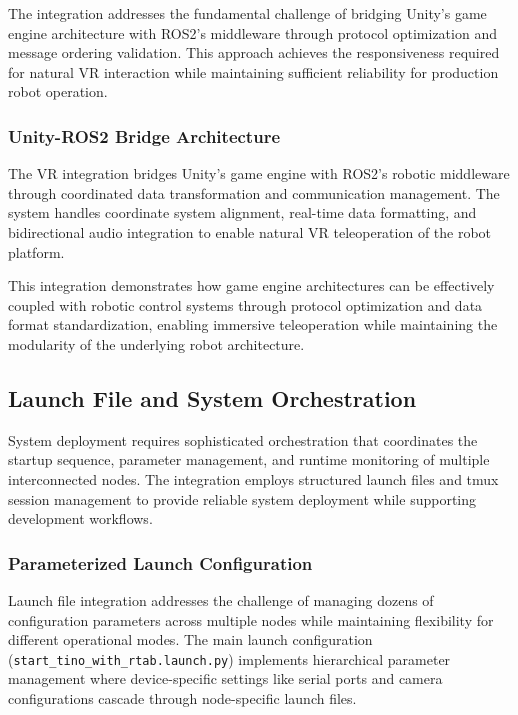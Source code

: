 The integration addresses the fundamental challenge of bridging Unity's game engine architecture with ROS2's middleware through protocol optimization and message ordering validation. This approach achieves the responsiveness required for natural VR interaction while maintaining sufficient reliability for production robot operation.

\subsubsection{Unity-ROS2 Bridge Architecture}

The VR integration bridges Unity's game engine with ROS2's robotic middleware through coordinated data transformation and communication management. The system handles coordinate system alignment, real-time data formatting, and bidirectional audio integration to enable natural VR teleoperation of the robot platform.

This integration demonstrates how game engine architectures can be effectively coupled with robotic control systems through protocol optimization and data format standardization, enabling immersive teleoperation while maintaining the modularity of the underlying robot architecture.

\subsection{Launch File and System Orchestration}

System deployment requires sophisticated orchestration that coordinates the startup sequence, parameter management, and runtime monitoring of multiple interconnected nodes. The integration employs structured launch files and tmux session management to provide reliable system deployment while supporting development workflows.

\subsubsection{Parameterized Launch Configuration}

Launch file integration addresses the challenge of managing dozens of configuration parameters across multiple nodes while maintaining flexibility for different operational modes. The main launch configuration (\texttt{start\_tino\_with\_rtab.launch.py}) implements hierarchical parameter management where device-specific settings like serial ports and camera configurations cascade through node-specific launch files.

